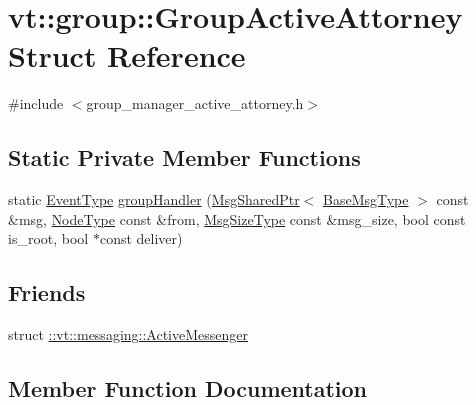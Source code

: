 \hypertarget{structvt_1_1group_1_1_group_active_attorney}{}\section{vt\+:\+:group\+:\+:Group\+Active\+Attorney Struct Reference}
\label{structvt_1_1group_1_1_group_active_attorney}


{\ttfamily \#include $<$group\+\_\+manager\+\_\+active\+\_\+attorney.\+h$>$}

\subsection*{Static Private Member Functions}
\begin{DoxyCompactItemize}
\item 
static \hyperlink{namespacevt_a009267401def7ae8bf201892222d060f}{Event\+Type} \hyperlink{structvt_1_1group_1_1_group_active_attorney_a1f912dce4eb510000705058ab4872152}{group\+Handler} (\hyperlink{namespacevt_ab2b3d506ec8e8d1540aede826d84a239}{Msg\+Shared\+Ptr}$<$ \hyperlink{namespacevt_a44d0d4e144748f2b19a1cfd962f50338}{Base\+Msg\+Type} $>$ const \&msg, \hyperlink{namespacevt_a866da9d0efc19c0a1ce79e9e492f47e2}{Node\+Type} const \&from, \hyperlink{namespacevt_abfa009d900299ac1df967b40ea8f2c8a}{Msg\+Size\+Type} const \&msg\+\_\+size, bool const is\+\_\+root, bool $\ast$const deliver)
\end{DoxyCompactItemize}
\subsection*{Friends}
\begin{DoxyCompactItemize}
\item 
struct \hyperlink{structvt_1_1group_1_1_group_active_attorney_a31cb499e12b002c0912506ddca0efcaa}{\+::vt\+::messaging\+::\+Active\+Messenger}
\end{DoxyCompactItemize}


\subsection{Member Function Documentation}
\mbox{\label{structvt_1_1group_1_1_group_active_attorney_a1f912dce4eb510000705058ab4872152}} 
